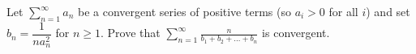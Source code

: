 Let $\displaystyle \sum_{n=1}^\infty a_n$ be a convergent series of positive
terms (so $a_i > 0$ for all $i$) and set $b_n = \dfrac{1}{n a_n^2}$ for $n \geq
1$. Prove that $\displaystyle \sum_{n=1}^\infty \frac{n}{b_1 + b_2 + \dots +
b_n}$ is convergent.
